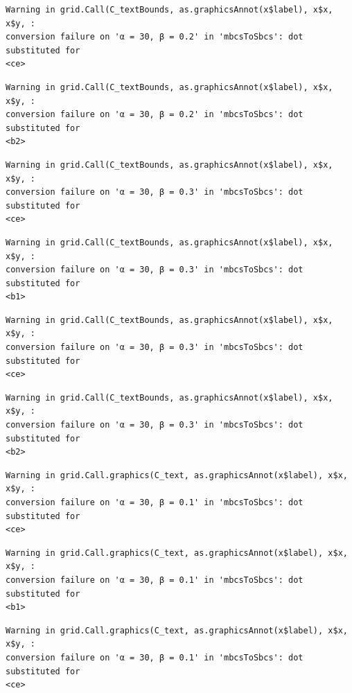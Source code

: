 \documentclass[
  spanish,
  a4paper,
]{scrreport}
\theoremstyle{plain}
\theoremstyle{definition}
\theoremstyle{definition}
\theoremstyle{remark}
\begin{document}
\begin{verbatim}
Warning in grid.Call(C_textBounds, as.graphicsAnnot(x$label), x$x, x$y, :
conversion failure on 'α = 30, β = 0.2' in 'mbcsToSbcs': dot substituted for
<ce>
\end{verbatim}

\begin{verbatim}
Warning in grid.Call(C_textBounds, as.graphicsAnnot(x$label), x$x, x$y, :
conversion failure on 'α = 30, β = 0.2' in 'mbcsToSbcs': dot substituted for
<b2>
\end{verbatim}

\begin{verbatim}
Warning in grid.Call(C_textBounds, as.graphicsAnnot(x$label), x$x, x$y, :
conversion failure on 'α = 30, β = 0.3' in 'mbcsToSbcs': dot substituted for
<ce>
\end{verbatim}

\begin{verbatim}
Warning in grid.Call(C_textBounds, as.graphicsAnnot(x$label), x$x, x$y, :
conversion failure on 'α = 30, β = 0.3' in 'mbcsToSbcs': dot substituted for
<b1>
\end{verbatim}

\begin{verbatim}
Warning in grid.Call(C_textBounds, as.graphicsAnnot(x$label), x$x, x$y, :
conversion failure on 'α = 30, β = 0.3' in 'mbcsToSbcs': dot substituted for
<ce>
\end{verbatim}

\begin{verbatim}
Warning in grid.Call(C_textBounds, as.graphicsAnnot(x$label), x$x, x$y, :
conversion failure on 'α = 30, β = 0.3' in 'mbcsToSbcs': dot substituted for
<b2>
\end{verbatim}

\begin{verbatim}
Warning in grid.Call.graphics(C_text, as.graphicsAnnot(x$label), x$x, x$y, :
conversion failure on 'α = 30, β = 0.1' in 'mbcsToSbcs': dot substituted for
<ce>
\end{verbatim}

\begin{verbatim}
Warning in grid.Call.graphics(C_text, as.graphicsAnnot(x$label), x$x, x$y, :
conversion failure on 'α = 30, β = 0.1' in 'mbcsToSbcs': dot substituted for
<b1>
\end{verbatim}

\begin{verbatim}
Warning in grid.Call.graphics(C_text, as.graphicsAnnot(x$label), x$x, x$y, :
conversion failure on 'α = 30, β = 0.1' in 'mbcsToSbcs': dot substituted for
<ce>
\end{verbatim}
\end{document}
